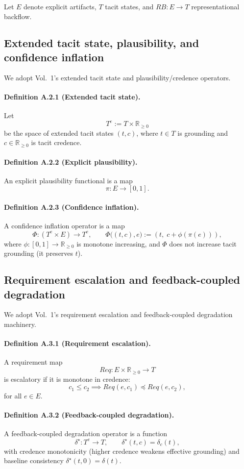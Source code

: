 \documentclass[preprints,article,submit,pdftex,moreauthors,accept]{Definitions/mdpi}
\begin{document}
Let \(E\) denote explicit artifacts, \(T\) tacit states, and \(RB:E\to T\) representational backflow.

\subsection{Extended tacit state, plausibility, and confidence inflation}
We adopt Vol.~1's extended tacit state and plausibility/credence operators.

\paragraph{Definition A.2.1 (Extended tacit state).}
Let
\[
T^e := T \times \mathbb{R}_{\ge 0}
\]
be the space of extended tacit states \((t,c)\), where \(t\in T\) is grounding and \(c\in \mathbb{R}_{\ge 0}\) is tacit credence.

\paragraph{Definition A.2.2 (Explicit plausibility).}
An explicit plausibility functional is a map
\[
\pi:E\to [0,1].
\]

\paragraph{Definition A.2.3 (Confidence inflation).}
A confidence inflation operator is a map
\[
\Phi:(T^e\times E)\to T^e,\qquad \Phi\big((t,c),e\big):=(t,\;c+\phi(\pi(e))),
\]
where \(\phi:[0,1]\to \mathbb{R}_{\ge 0}\) is monotone increasing, and \(\Phi\) does not increase tacit grounding (it preserves \(t\)).

\subsection{Requirement escalation and feedback-coupled degradation}
We adopt Vol.~1's requirement escalation and feedback-coupled degradation machinery.

\paragraph{Definition A.3.1 (Requirement escalation).}
A requirement map
\[
Req:E\times \mathbb{R}_{\ge 0}\to T
\]
is escalatory if it is monotone in credence:
\[
c_1\le c_2 \implies Req(e,c_1)\preceq Req(e,c_2),
\]
for all \(e\in E\).

\paragraph{Definition A.3.2 (Feedback-coupled degradation).}
A feedback-coupled degradation operator is a function
\[
\delta^\star:T^e\to T,\qquad \delta^\star(t,c)=\delta_c(t),
\]
with credence monotonicity (higher credence weakens effective grounding) and baseline consistency \(\delta^\star(t,0)=\delta(t)\).
\end{document}
